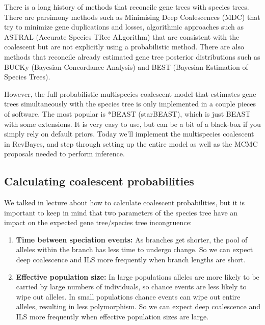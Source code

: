 \documentclass[11pt]{article}
\begin{document}
There is a long history of methods that reconcile gene trees
with species trees. There are parsimony methods such as 
Minimising Deep Coalescences (MDC) that try to minimize gene duplications and losses, 
algorithmic approaches such as ASTRAL (Accurate Species TRee ALgorithm)
that are consistent with the coalescent but are not explicitly using a probabilistic method.
There are also methods that reconcile already estimated gene tree posterior distributions
such as BUCKy (Bayesian Concordance Analysis) and BEST (Bayesian Estimation of Species Trees).

However, the full probabilistic multispecies coalescent model that estimates
gene trees simultaneously with the species tree is only implemented
in a couple pieces of software. The most popular is *BEAST (starBEAST),
which is just BEAST with some extensions. It is very easy to use, but can
be a bit of a black-box if you simply rely on default priors.
Today we'll implement the multispecies coalescent in RevBayes,
and step through setting up the entire model as well as the MCMC proposals
needed to perform inference.

\subsection{Calculating coalescent probabilities}

We talked in lecture about how to calculate coalescent probabilities, but
it is important to keep in mind that two parameters of the species tree have an impact on the expected
gene tree/species tree incongruence:

\begin{enumerate}

\item \textbf{Time between speciation events:}
    As branches get shorter, the pool of alleles within the branch has less time to undergo change.
    So we can expect deep coalescence and ILS more frequently when branch lengths are short.

\item \textbf{Effective population size:}
    In large populations alleles are more likely to be carried by large numbers of individuals,
    so chance events are less likely to wipe out alleles. 
    In small populations chance events can wipe out entire alleles, resulting in less polymorphism.
    So we can expect deep coalescence and ILS more frequently when effective population sizes are large.

\end{enumerate}
\end{document}
